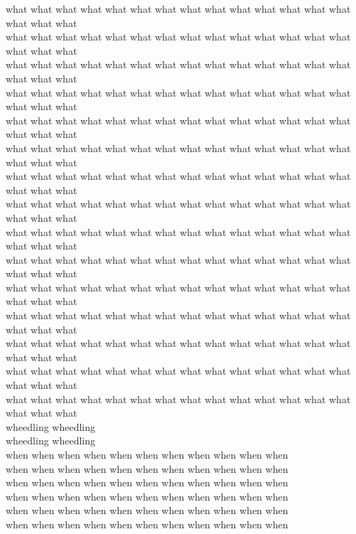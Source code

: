 what what what what what what what what what what what what what what what what what\\
what what what what what what what what what what what what what what what what what\\
what what what what what what what what what what what what what what what what what\\
what what what what what what what what what what what what what what what what what\\
what what what what what what what what what what what what what what what what what\\
what what what what what what what what what what what what what what what what what\\
what what what what what what what what what what what what what what what what what\\
what what what what what what what what what what what what what what what what what\\
what what what what what what what what what what what what what what what what what\\
what what what what what what what what what what what what what what what what what\\
what what what what what what what what what what what what what what what what what\\
what what what what what what what what what what what what what what what what what\\
what what what what what what what what what what what what what what what what what\\
what what what what what what what what what what what what what what what what what\\
what what what what what what what what what what what what what what what what what\\
wheedling wheedling\\
wheedling wheedling\\
when when when when when when when when when when when\\
when when when when when when when when when when when\\
when when when when when when when when when when when\\
when when when when when when when when when when when\\
when when when when when when when when when when when\\
when when when when when when when when when when when\\
